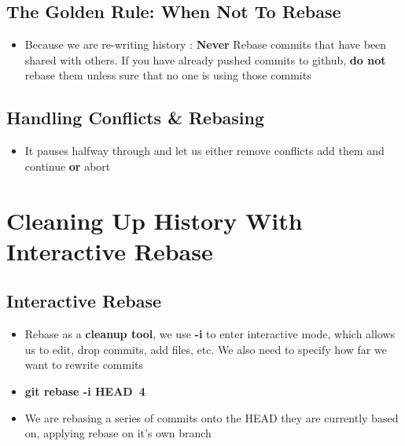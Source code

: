 \documentclass{report}
\newcommand{\warning}{
	{\fontencoding{U}\fontfamily{futs}\selectfont\char 66\relax}
}
\begin{document}
\section{The Golden Rule: When Not To Rebase}

\begin{itemize}
	\item Because we are re-writing history : \warning \textbf{Never} Rebase commits that have been shared with others. If you have already pushed commits to github, \textbf{do not} rebase them unless sure that no one is using those commits
\end{itemize}


\section{Handling Conflicts \& Rebasing}
\begin{itemize}
	\item It pauses halfway through and let us either remove conflicts add them and continue \textbf{or} abort
\end{itemize}



\chapter{Cleaning Up History With Interactive Rebase}


\section{Interactive Rebase}

\begin{itemize}
	\item Rebase as a \textbf{cleanup tool}, we use \textbf{-i} to enter interactive mode, which allows us to edit, drop commits, add files, etc. We also need to specify how far we want to rewrite commits 
	\item \textbf{git rebase -i HEAD~4} 
	\item We are rebasing a series of commits onto the HEAD they are currently based on, applying rebase on it's own branch
\end{itemize}
\end{document}
